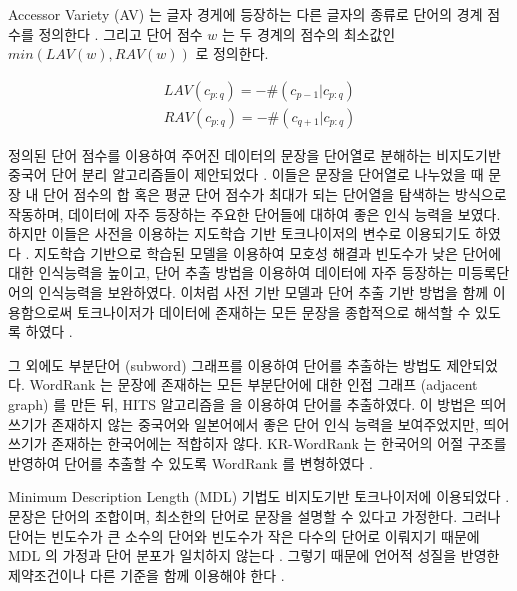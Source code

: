 \documentclass[11pt]{article}
\begin{document}
Accessor Variety (AV) 는 글자 경게에 등장하는 다른 글자의 종류로 단어의 경계 점수를 정의한다 \citep{feng2004accessor}.
그리고 단어 점수 $w$ 는 두 경계의 점수의 최소값인 $min(LAV(w), RAV(w))$ 로 정의한다.

\begin{equation}
\label{eq:av}
\begin{aligned}
LAV(c_{p:q}) = - \# (c_{p-1} \vert c_{p:q}) \\
RAV(c_{p:q}) = - \# (c_{q+1} \vert c_{p:q}) 
\end{aligned}
\end{equation}

정의된 단어 점수를 이용하여 주어진 데이터의 문장을 단어열로 분해하는 비지도기반 중국어 단어 분리 알고리즘들이 제안되었다 \citep{zhao2008exploiting, feng2004unsupervised}.
이들은 문장을 단어열로 나누었을 때 문장 내 단어 점수의 합 혹은 평균 단어 점수가 최대가 되는 단어열을 탐색하는 방식으로 작동하며, 데이터에 자주 등장하는 주요한 단어들에 대하여 좋은 인식 능력을 보였다.
하지만 이들은 사전을 이용하는 지도학습 기반 토크나이저의 변수로 이용되기도 하였다 \citep{zhao2007incorporating, zhao2008unsupervised, zhao2011integrating, sun2011enhancing, zheng2013deep}.
지도학습 기반으로 학습된 모델을 이용하여 모호성 해결과 빈도수가 낮은 단어에 대한 인식능력을 높이고, 단어 추출 방법을 이용하여 데이터에 자주 등장하는 미등록단어의 인식능력을 보완하였다.
이처럼 사전 기반 모델과 단어 추출 기반 방법을 함께 이용함으로써 토크나이저가 데이터에 존재하는 모든 문장을 종합적으로 해석할 수 있도록 하였다 \citep{zhao2007incorporating}. 

그 외에도 부분단어 (subword) 그래프를 이용하여 단어를 추출하는 방법도 제안되었다.
WordRank \citep{chen2011simple}는 문장에 존재하는 모든 부분단어에 대한 인접 그래프 (adjacent graph) 를 만든 뒤, HITS 알고리즘을 \citep{kleinberg1999authoritative}을 이용하여 단어를 추출하였다.
이 방법은 띄어쓰기가 존재하지 않는 중국어와 일본어에서 좋은 단어 인식 능력을 보여주었지만, 띄어쓰기가 존재하는 한국어에는 적합히자 않다.
KR-WordRank 는 한국어의 어절 구조를 반영하여 단어를 추출할 수 있도록 WordRank 를 변형하였다 \citep{kim2014kr}.

Minimum Description Length (MDL) 기법도 비지도기반 토크나이저에 이용되었다 \citep{kityz1999unsupervised, hewlett2011fully, zhikov2013efficient}.
문장은 단어의 조합이며, 최소한의 단어로 문장을 설명할 수 있다고 가정한다.
그러나 단어는 빈도수가 큰 소수의 단어와 빈도수가 작은 다수의 단어로 이뤄지기 때문에 MDL 의 가정과 단어 분포가 일치하지 않는다 \citep{magistry2013can}.
그렇기 때문에 언어적 성질을 반영한 제약조건이나 다른 기준을 함께 이용해야 한다 \citep{magistry2013can, hewlett2011fully}.
\end{document}
